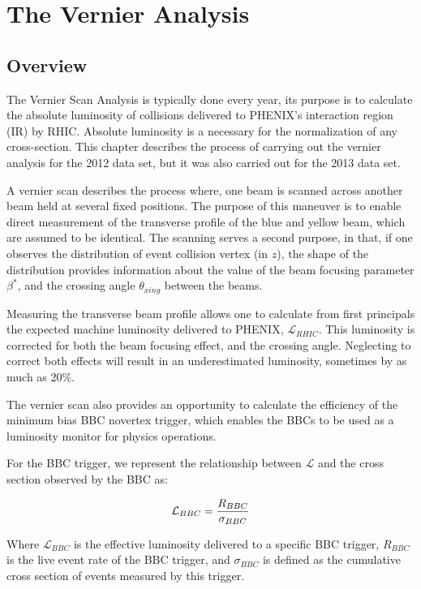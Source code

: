\chapter{The Vernier Analysis}
\label{ch:vernier_analysis}
\section{Overview}

The Vernier Scan Analysis is typically done every year, its purpose is to
calculate the absolute luminosity of collisions delivered to PHENIX's
interaction region (IR) by RHIC.  Absolute luminosity is a necessary for the
normalization of any cross-section. This chapter describes the process of
carrying out the vernier analysis for the 2012 data set, but it was also
carried out for the 2013 data set.

A vernier scan describes the process where, one beam is scanned across another
beam held at several fixed positions. The purpose of this maneuver is to enable
direct measurement of the transverse profile of the blue and yellow beam, which
are assumed to be identical. The scanning serves a second purpose, in that, if
one observes the distribution of event collision vertex (in $z$), the shape of
the distribution provides information about the value of the beam focusing
parameter $\beta^*$, and the crossing angle $\theta_{xing}$ between the beams.

Measuring the transverse beam profile allows one to calculate from first
principals the expected machine luminosity delivered to PHENIX,
$\mathcal{L}_{RHIC}$. This luminosity is corrected for both the beam focusing
effect, and the crossing angle. Neglecting to correct both effects will result
in an underestimated luminosity, sometimes by as much as 20\%.

The vernier scan also provides an opportunity to calculate the efficiency of the
minimum bias BBC novertex trigger, which enables the BBCs to be used as a
luminosity monitor for physics operations. 

For the BBC trigger, we represent the relationship between $\mathcal{L}$
and the cross section observed by the BBC as:

\begin{equation} 
\label{eq:lumi_xsec_simple} 
\mathcal{L}_{BBC} = {R_{BBC}\over\sigma_{BBC}} 
\end{equation}

{\noindent}Where $\mathcal{L}_{BBC}$ is the effective luminosity delivered to a
specific BBC trigger, $R_{BBC}$ is the live event rate of the BBC trigger, and
$\sigma_{BBC}$ is defined as the cumulative cross section of events measured by
this trigger.

